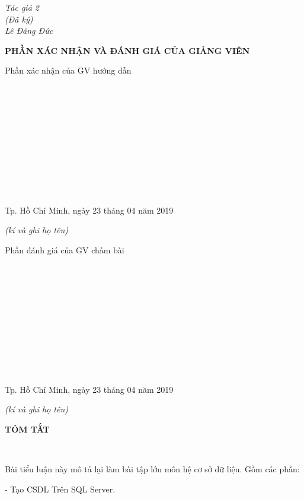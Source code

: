 \documentclass{report}
\begin{document}
\setlength{\parindent}{12cm}
\textit{Tác giả 2}\\

\setlength{\parindent}{12cm}
\textit{(Đã ký)}\\

\setlength{\parindent}{11.5cm}
\textit{Lê Đăng Đức}\\

\newpage
\changefontsizes{16pt}
\centerline{\textbf{PHẦN XÁC NHẬN VÀ ĐÁNH GIÁ CỦA GIẢNG VIÊN}}
\bigskip
\changefontsizes{13pt}
\setlength{\parindent}{2.2cm}
Phần xác nhận của GV hướng dẫn

\vspace{0.8cm}
\setlength{\parindent}{1cm}
\ \xfill{1pt} \

\bigskip
\ \xfill{1pt} \

\bigskip
\ \xfill{1pt} \

\bigskip
\ \xfill{1pt} \

\bigskip
\ \xfill{1pt} \

\bigskip
\ \xfill{1pt} \

\changefontsizes{12pt}
\setlength{\parindent}{8cm}
Tp. Hồ Chí Minh, ngày 23 tháng 04 năm 2019

\setlength{\parindent}{11cm}
\textit{(kí và ghi họ tên)}

\changefontsizes{13pt}
\vspace{2.5cm}
\setlength{\parindent}{2.2cm}
Phần đánh giá của GV chấm bài

\vspace{0.8cm}
\setlength{\parindent}{1cm}
\ \xfill{1pt} \

\bigskip
\ \xfill{1pt} \

\bigskip
\ \xfill{1pt} \

\bigskip
\ \xfill{1pt} \

\bigskip
\ \xfill{1pt} \

\bigskip
\ \xfill{1pt} \

\changefontsizes{12pt}
\setlength{\parindent}{8cm}
Tp. Hồ Chí Minh, ngày 23 tháng 04 năm 2019

\setlength{\parindent}{11cm}
\textit{(kí và ghi họ tên)}

\newpage
\changefontsizes{16pt}
\centerline{\textbf{TÓM TẮT}}\

\changefontsizes{13pt}
\setlength{\parindent}{2cm}

Bài tiểu luận này mô tả lại làm bài tập lớn môn hệ cơ sở dữ liệu. Gồm các phần:

\setlength{\parindent}{2.5cm}
- Tạo CSDL Trên SQL Server.
\end{document}
